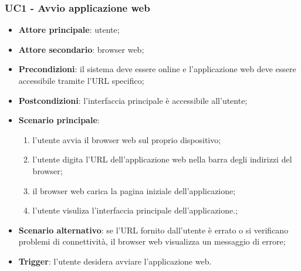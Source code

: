 \documentclass[10pt, a4paper]{article}
\begin{document}
    \subsubsection{UC1 - Avvio applicazione web}
    \begin{itemize}
        \item \textbf{Attore principale}: utente;
        \item \textbf{Attore secondario}: browser web;
        \item \textbf{Precondizioni}: il sistema deve essere online e l'applicazione web deve essere accessibile tramite l'URL specifico;
        \item \textbf{Postcondizioni}: l'interfaccia principale è accessibile all'utente;
        \item \textbf{Scenario principale}:
            \begin{enumerate}
                \item l'utente avvia il browser web sul proprio dispositivo;
                \item l'utente digita l'URL dell'applicazione web nella barra degli indirizzi del browser;
                \item il browser web carica la pagina iniziale dell'applicazione;
                \item l'utente visuliza l'interfaccia principale dell'applicazione.; 
            \end{enumerate}
        \item \textbf{Scenario alternativo}: se l'URL fornito dall'utente è errato o si verificano problemi di connettività, il browser web visualizza un messaggio di errore;
        \item \textbf{Trigger}: l'utente desidera avviare l'applicazione web.
    \end{itemize}
\end{document}
